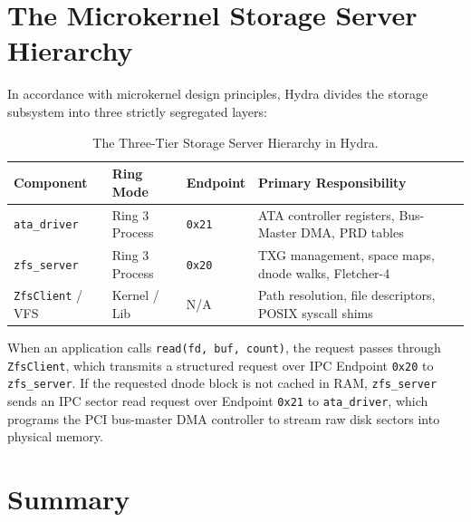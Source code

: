 \section{The Microkernel Storage Server Hierarchy}
\label{sec:storage_server}

In accordance with microkernel design principles, Hydra divides the storage subsystem into three strictly segregated layers:

\begin{table}[htbp]
\centering
\small
\begin{tabular}{llll}
\hline
\textbf{Component} & \textbf{Ring Mode} & \textbf{Endpoint} & \textbf{Primary Responsibility} \\
\hline
\texttt{ata\_driver} & Ring 3 Process & \texttt{0x21} & ATA controller registers, Bus-Master DMA, PRD tables \\
\texttt{zfs\_server} & Ring 3 Process & \texttt{0x20} & TXG management, space maps, dnode walks, Fletcher-4 \\
\texttt{ZfsClient} / VFS & Kernel / Lib & N/A & Path resolution, file descriptors, POSIX syscall shims \\
\hline
\end{tabular}
\caption{The Three-Tier Storage Server Hierarchy in Hydra.}
\label{tab:storage_layers}
\end{table}

When an application calls \texttt{read(fd, buf, count)}, the request passes through \texttt{ZfsClient}, which transmits a structured request over IPC Endpoint \texttt{0x20} to \texttt{zfs\_server}. If the requested dnode block is not cached in RAM, \texttt{zfs\_server} sends an IPC sector read request over Endpoint \texttt{0x21} to \texttt{ata\_driver}, which programs the PCI bus-master DMA controller to stream raw disk sectors into physical memory.

\section{Summary}
\label{sec:summary_chap4}

